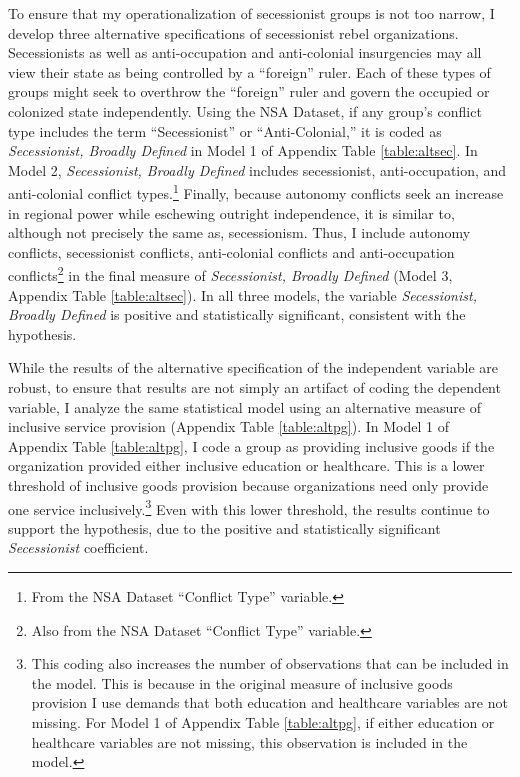 \documentclass[12pt, letterpaper]{article}
\begin{document}
To ensure that my operationalization of secessionist groups is not too narrow, I develop three alternative specifications of secessionist rebel organizations. Secessionists as well as anti-occupation and anti-colonial insurgencies may all view their state as being controlled by a ``foreign'' ruler. Each of these types of groups might seek to overthrow the ``foreign'' ruler and govern the occupied or colonized state independently. Using the NSA Dataset, if any group's conflict type includes the term ``Secessionist'' or ``Anti-Colonial,'' it is coded as \textit{Secessionist, Broadly Defined} in Model 1 of Appendix Table \ref{table:altsec}. In Model 2, \textit{Secessionist, Broadly Defined} includes secessionist, anti-occupation, and anti-colonial conflict types.\footnote{From the NSA Dataset ``Conflict Type'' variable.} Finally, because autonomy conflicts seek an increase in regional power while eschewing outright independence, it is similar to, although not precisely the same as, secessionism. Thus, I include autonomy conflicts, secessionist conflicts, anti-colonial conflicts and anti-occupation conflicts\footnote{Also from the NSA Dataset ``Conflict Type'' variable.} in the final measure of \textit{Secessionist, Broadly Defined} (Model 3, Appendix Table \ref{table:altsec}). In all three models, the variable \textit{Secessionist, Broadly Defined} is positive and statistically significant, consistent with the hypothesis. 

While the results of the alternative specification of the independent variable are robust, to ensure that results are not simply an artifact of coding the dependent variable, I analyze the same statistical model using an alternative measure of inclusive service provision (Appendix Table \ref{table:altpg}). In Model 1 of Appendix Table \ref{table:altpg}, I code a group as providing inclusive goods if the organization provided either inclusive education or healthcare. This is a lower threshold of inclusive goods provision because organizations need only provide one service inclusively.\footnote{This coding also increases the number of observations that can be included in the model. This is because in the original measure of inclusive goods provision I use demands that both education and healthcare variables are not missing. For Model 1 of Appendix Table \ref{table:altpg}, if either education or healthcare variables are not missing, this observation is included in the model.} Even with this lower threshold, the results continue to support the hypothesis, due to the positive and statistically significant \textit{Secessionist} coefficient. 
\end{document}
